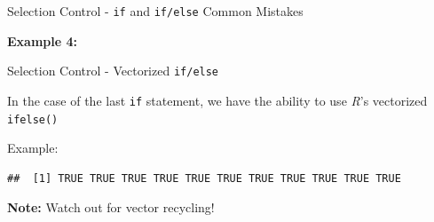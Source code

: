 \begin{frame}[fragile]{Selection Control - \texttt{if} and
\texttt{if/else} Common Mistakes}

\textbf{Example 4:}

\begin{Shaded}
\begin{Highlighting}[]
\StringTok{ }\NormalTok{(}\NormalTok{,}\NormalTok{,} \NormalTok{)}
\StringTok{ }\NormalTok{,}\NormalTok{,} \NormalTok{)}
\StringTok{ }
\end{Highlighting}
\end{Shaded}

\end{frame}

\begin{frame}[fragile]{Selection Control - Vectorized \texttt{if/else}}

In the case of the last \texttt{if} statement, we have the ability to
use \emph{R}'s vectorized \texttt{ifelse()}

\begin{Shaded}
\begin{Highlighting}[]
\end{Highlighting}
\end{Shaded}

Example:

\begin{Shaded}
\begin{Highlighting}[]
\StringTok{ }\NormalTok{(}\NormalTok{,}\NormalTok{,} \NormalTok{)}
\StringTok{ }\NormalTok{(}\NormalTok{,}\NormalTok{,} \NormalTok{)}
\StringTok{ }\NormalTok{, }\NormalTok{)}
\end{Highlighting}
\end{Shaded}

\begin{verbatim}
##  [1] TRUE TRUE TRUE TRUE TRUE TRUE TRUE TRUE TRUE TRUE TRUE
\end{verbatim}

\textbf{Note:} Watch out for vector recycling!

\end{frame}

